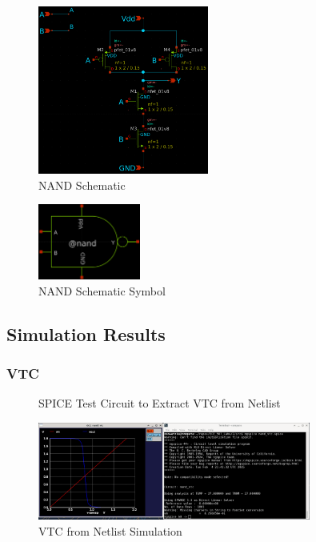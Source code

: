 \documentclass{article}
\begin{document}
	\begin{figure}[H]
		\centerline{\includegraphics[width=0.5\textwidth]{nand_schematic.png}}
		\caption{NAND Schematic}
		\label{fig::nand_schematic}
	\end{figure}
	
	\begin{figure}[H]
		\centerline{\includegraphics[width=0.3\textwidth]{nand_symbol.png}}
		\caption{NAND Schematic Symbol}
		\label{fig::nand_symbol}
	\end{figure}
	
	\subsection{Simulation Results}
	
	\subsubsection{VTC}
	\begin{figure}[H]
		
		\caption{SPICE Test Circuit to Extract VTC from Netlist}
		\label{fig::nand_vtc_test_circuit}
	\end{figure}
	
	\begin{figure}[H]
		\centerline{\includegraphics[width=0.8\textwidth]{nand_vtc.png}}
		\caption{VTC from Netlist Simulation}
		\label{fig::nand_vtc}
	\end{figure}
	
\end{document}
